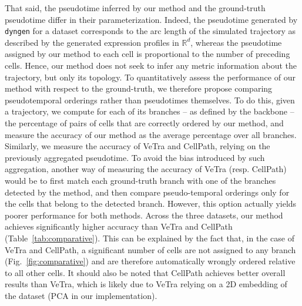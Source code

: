 \documentclass[pdflatex,sn-mathphys-num]{sn-jnl}%
\theoremstyle{thmstyleone}%
\theoremstyle{thmstyletwo}%
\theoremstyle{thmstylethree}%
\newcommand{\bR}{\mathbb R}
\begin{document}
\medbreak
That said, the pseudotime inferred by our method and the ground-truth pseudotime differ in their parameterization. Indeed, the pseudotime generated by \texttt{dyngen} for a dataset corresponds to the arc length of the simulated trajectory as described by the generated expression profiles in $\bR^d$, whereas the pseudotime assigned by our method to each cell is proportional to the number of preceding cells. Hence, our method does not seek to infer any metric information about the trajectory, but only its topology. To quantitatively assess the performance of our method with respect to the ground-truth, we therefore propose comparing pseudotemporal orderings rather than pseudotimes themselves. To do this, given a trajectory, we compute for each of its branches -- as defined by the backbone -- the percentage of pairs of cells that are correctly ordered by our method, and measure the accuracy of our method as the average percentage over all branches. Similarly, we measure the accuracy of VeTra and CellPath, relying on the previously aggregated pseudotime. To avoid the bias introduced by such aggregation, another way of measuring the accuracy of VeTra (resp. CellPath) would be to first match each ground-truth branch with one of the branches detected by the method, and then compare pseudo-temporal orderings only for the cells that belong to the detected branch. However, this option actually yields poorer performance for both methods. Across the three datasets, our method achieves significantly higher accuracy than VeTra and CellPath (Table~\ref{tab:comparative}). This can be explained by the fact that, in the case of VeTra and CellPath, a significant number of cells are not assigned to any branch (Fig.~\ref{fig:comparative}) and are therefore automatically wrongly ordered relative to all other cells. It should also be noted that CellPath achieves better overall results than VeTra, which is likely due to VeTra relying on a 2D embedding of the dataset (PCA in our implementation). 
\end{document}
